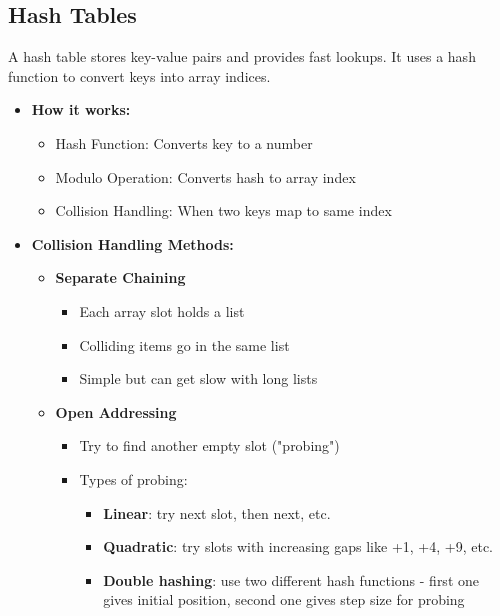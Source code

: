 \documentclass[11pt,a4paper]{article}
\begin{document}
\begin{multicols}{2}
\subsection{Hash Tables}
A hash table stores key-value pairs and provides fast lookups. It uses a hash function to convert keys into array indices.

\begin{itemize}
    \item \textbf{How it works:}
    \begin{itemize}
        \item Hash Function: Converts key to a number
        \item Modulo Operation: Converts hash to array index
        \item Collision Handling: When two keys map to same index
    \end{itemize}

    \item \textbf{Collision Handling Methods:}
    \begin{itemize}
        \item \textbf{Separate Chaining}
        \begin{itemize}
            \item Each array slot holds a list
            \item Colliding items go in the same list
            \item Simple but can get slow with long lists
        \end{itemize}
        \item \textbf{Open Addressing}
        \begin{itemize}
            \item Try to find another empty slot ("probing")
            \item Types of probing:
            \begin{itemize}
                \item \textbf{Linear}: try next slot, then next, etc.
                \item \textbf{Quadratic}: try slots with increasing gaps like +1, +4, +9, etc.
                \item \textbf{Double hashing}: use two different hash functions - first one gives initial position, second one gives step size for probing
            \end{itemize}
        \end{itemize}
    \end{itemize}


\end{itemize}
\end{multicols}
\end{document}
